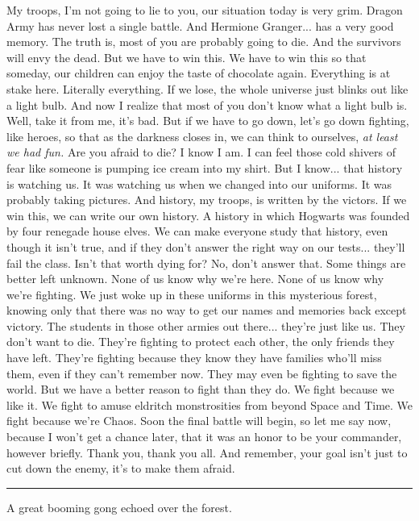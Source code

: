 My troops, I'm not going to lie to you, our situation today is very
grim. Dragon Army has never lost a single battle. And Hermione
Granger... has a very good memory. The truth is, most of you are
probably going to die. And the survivors will envy the dead. But we have
to win this. We have to win this so that someday, our children can enjoy
the taste of chocolate again. Everything is at stake here. Literally
everything. If we lose, the whole universe just blinks out like a light
bulb. And now I realize that most of you don't know what a light bulb
is. Well, take it from me, it's bad. But if we have to go down, let's go
down fighting, like heroes, so that as the darkness closes in, we can
think to ourselves, \emph{at least we had fun.} Are you afraid to die? I
know I am. I can feel those cold shivers of fear like someone is pumping
ice cream into my shirt. But I know... that history is watching us.
It was watching us when we changed into our uniforms. It was probably
taking pictures. And history, my troops, is written by the victors. If
we win this, we can write our own history. A history in which Hogwarts
was founded by four renegade house elves. We can make everyone study
that history, even though it isn't true, and if they don't answer the
right way on our tests... they'll fail the class. Isn't that worth
dying for? No, don't answer that. Some things are better left unknown.
None of us know why we're here. None of us know why we're fighting. We
just woke up in these uniforms in this mysterious forest, knowing only
that there was no way to get our names and memories back except victory.
The students in those other armies out there... they're just like
us. They don't want to die. They're fighting to protect each other, the
only friends they have left. They're fighting because they know they
have families who'll miss them, even if they can't remember now. They
may even be fighting to save the world. But we have a better reason to
fight than they do. We fight because we like it. We fight to amuse
eldritch monstrosities from beyond Space and Time. We fight because
we're Chaos. Soon the final battle will begin, so let me say now,
because I won't get a chance later, that it was an honor to be your
commander, however briefly. Thank you, thank you all. And remember, your
goal isn't just to cut down the enemy, it's to make them afraid.

\begin{center}\rule{3in}{0.4pt}\end{center}

A great booming gong echoed over the forest.

